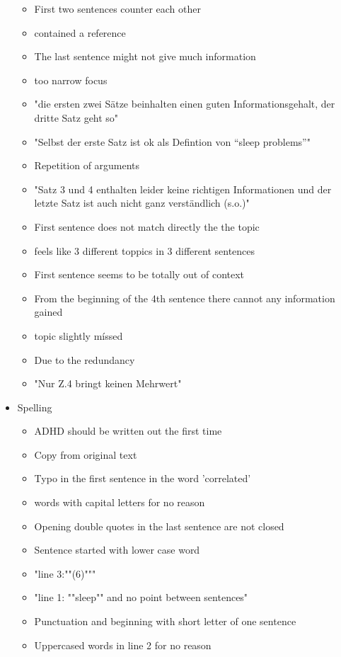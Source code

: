 \begin{itemize}[topsep = 0pt, itemsep = 0pt]
	\begin{itemize}[topsep = 0pt, itemsep = 0pt]
		\item First two sentences counter each other
		\item contained a reference
		\item The last sentence might not give much information
		\item too narrow focus
		\item "die ersten zwei Sätze beinhalten einen guten Informationsgehalt, der dritte Satz geht so"
		\item "Selbst der erste Satz ist ok als Defintion von “sleep problems”"
		\item Repetition of arguments
		\item "Satz 3 und 4 enthalten leider keine richtigen Informationen und der letzte Satz ist auch nicht ganz verständlich (s.o.)"
		\item First sentence does not match directly the the topic
		\item feels like 3 different toppics in 3 different sentences
		\item First sentence seems to be totally out of context
		\item From the beginning of the 4th sentence there cannot any information gained
		\item topic slightly míssed
		\item Due to the redundancy
		\item "Nur Z.4 bringt keinen Mehrwert"
	\end{itemize}
	\item Spelling
	\begin{itemize}[topsep = 0pt, itemsep = 0pt]
		\item ADHD should be written out the first time
		\item Copy from original text
		\item Typo in the first sentence in the word 'correlated'
		\item words with capital letters for no reason
		\item Opening double quotes in the last sentence are not closed
		\item Sentence started with lower case word
		\item "line 3:""(6)"""
		\item "line 1: ""sleep"" and no point between sentences"
		\item Punctuation and beginning with short letter of one sentence
		\item Uppercased words in line 2 for no reason

\end{itemize}
\end{itemize}
